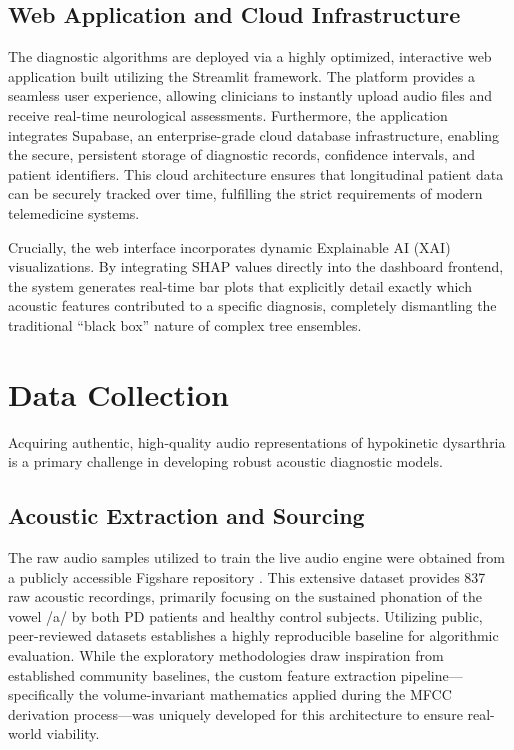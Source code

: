 \documentclass[conference]{IEEEtran}
\begin{document}
\subsection{Web Application and Cloud Infrastructure}
The diagnostic algorithms are deployed via a highly optimized, interactive web application built utilizing the Streamlit framework. The platform provides a seamless user experience, allowing clinicians to instantly upload audio files and receive real-time neurological assessments. Furthermore, the application integrates Supabase, an enterprise-grade cloud database infrastructure, enabling the secure, persistent storage of diagnostic records, confidence intervals, and patient identifiers. This cloud architecture ensures that longitudinal patient data can be securely tracked over time, fulfilling the strict requirements of modern telemedicine systems. 

Crucially, the web interface incorporates dynamic Explainable AI (XAI) visualizations. By integrating SHAP values directly into the dashboard frontend, the system generates real-time bar plots that explicitly detail exactly which acoustic features contributed to a specific diagnosis, completely dismantling the traditional ``black box'' nature of complex tree ensembles.

\section{Data Collection}
Acquiring authentic, high-quality audio representations of hypokinetic dysarthria is a primary challenge in developing robust acoustic diagnostic models.

\subsection{Acoustic Extraction and Sourcing}
The raw audio samples utilized to train the live audio engine were obtained from a publicly accessible Figshare repository \cite{figshare2023voice}. This extensive dataset provides 837 raw acoustic recordings, primarily focusing on the sustained phonation of the vowel /a/ by both PD patients and healthy control subjects. Utilizing public, peer-reviewed datasets establishes a highly reproducible baseline for algorithmic evaluation. While the exploratory methodologies draw inspiration from established community baselines, the custom feature extraction pipeline---specifically the volume-invariant mathematics applied during the MFCC derivation process---was uniquely developed for this architecture to ensure real-world viability.
\end{document}
